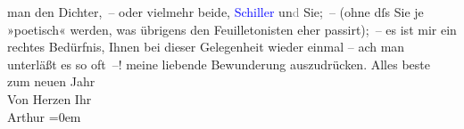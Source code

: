                     man den Dichter, – oder vielmehr beide, \textcolor{blue}{Schiller}{}\ledrightnote{\textcolor{blue}{Friedrich von Schiller}} un\textcolor{gray}{d} Sie; – (ohne dſs Sie je
                    »poetisch« werden, was übrigens den Feuilletonisten eher passirt); – es {\pb}ist mir ein rechtes Bedürfnis, Ihnen bei dieser
                    Gelegenheit wieder einmal – ach man unterläßt es so oft –! meine liebende
                    Bewunderung auszudrücken.\pend
           \pstart
           Alles beste zum neuen Jahr{\\[\baselineskip]}Von Herzen Ihr{\\[\baselineskip]}\spacefill\mbox{Arthur}\pend
           \leftskip=0em{}\endnumbering{}  
      